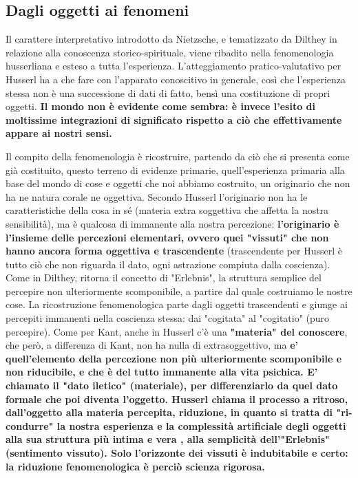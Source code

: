 \subsection{Dagli oggetti ai fenomeni}


Il carattere interpretativo introdotto da Nietzsche,
e tematizzato da Dilthey in relazione
alla conoscenza storico-spirituale, viene
ribadito nella fenomenologia husserliana e
esteso a tutta l'esperienza.
L'atteggiamento pratico-valutativo per Husserl
ha a che fare con l'apparato conoscitivo in
generale, così che l'esperienza stessa non è
una successione di dati di fatto, bensì una
costituzione di propri oggetti.
\textbf{Il mondo non è evidente come sembra: è invece
l'esito di moltissime integrazioni di significato
rispetto a ciò che effettivamente appare ai
nostri sensi.}

 Il compito della fenomenologia è
ricostruire, partendo da ciò che si presenta come
già costituito, questo terreno di evidenze
primarie, quell'esperienza primaria alla base
del mondo di cose e oggetti che noi abbiamo
costruito, un originario che non ha ne natura
corale ne oggettiva.
Secondo Husserl l'originario non ha le caratteristiche
della cosa in sé (materia extra soggettiva che
affetta la nostra sensibilità), ma è qualcosa
di immanente alla nostra percezione: \textbf{l'originario
è l'insieme delle percezioni elementari, ovvero quei
"vissuti" che non hanno ancora forma oggettiva e
trascendente} (trascendente per Husserl è tutto ciò che non riguarda il dato, ogni astrazione compiuta dalla coscienza).
Come in Dilthey, ritorna il concetto di "Erlebnis",
la struttura semplice del percepire non ulteriormente scomponibile, a partire dal quale costruiamo
le nostre cose. La ricostruzione fenomenologica
parte dagli oggetti trascendenti e giunge
ai percepiti immanenti nella coscienza stessa:
dai "cogitata" al "cogitatio" (puro percepire).
Come per Kant, anche in Husserl c'è una
\textbf{"materia" del conoscere}, che però, a differenza di
Kant, non ha nulla di extrasoggettivo, ma \textbf{e' quell'elemento della percezione non più ulteriormente
scomponibile e non riducibile, e che è del
tutto immanente alla vita psichica. E'
chiamato il "dato iletico" (materiale), per
differenziarlo da quel dato formale che poi diventa l'oggetto.
Husserl chiama il processo a ritroso, dall'oggetto alla materia percepita, riduzione,
in quanto si tratta di "ri-condurre" la
nostra esperienza e la complessità artificiale
degli oggetti alla sua struttura più intima
e vera , alla semplicità dell'"Erlebnis"
(sentimento vissuto).
Solo l'orizzonte dei vissuti è indubitabile e
certo: la riduzione fenomenologica è
perciò scienza rigorosa.}


